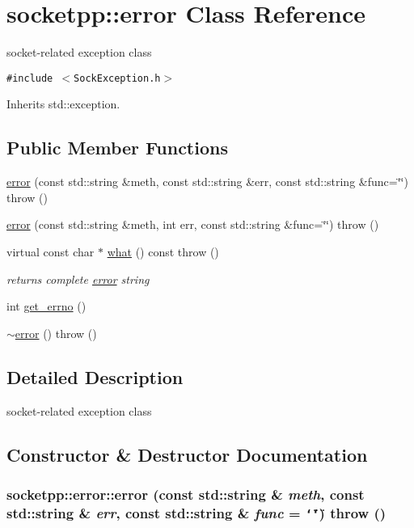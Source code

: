 \hypertarget{classsocketpp_1_1error}{
\section{socketpp::error Class Reference}
\label{classsocketpp_1_1error}
}
socket-related exception class  


{\tt \#include $<$SockException.h$>$}

Inherits std::exception.

\subsection*{Public Member Functions}
\begin{CompactItemize}
\item 
\hyperlink{classsocketpp_1_1error_614fef9f326d7bb212771eb20a046290}{error} (const std::string \&meth, const std::string \&err, const std::string \&func=\char`\"{}\char`\"{})  throw ()
\item 
\hyperlink{classsocketpp_1_1error_1287e8ec1ff5f7b18d91ea65c2505ae8}{error} (const std::string \&meth, int err, const std::string \&func=\char`\"{}\char`\"{})  throw ()
\item 
virtual const char $\ast$ \hyperlink{classsocketpp_1_1error_4b03541ebad2b9d0b73222cd505ea50f}{what} () const   throw ()
\begin{CompactList}\small\item\em returns complete \hyperlink{classsocketpp_1_1error}{error} string \item\end{CompactList}\item 
int \hyperlink{classsocketpp_1_1error_e1d23816909f2663b5553d232110442b}{get\_\-errno} ()
\item 
\hyperlink{classsocketpp_1_1error_f41562a951322078eff6f56268f2f257}{$\sim$error} ()  throw ()
\end{CompactItemize}


\subsection{Detailed Description}
socket-related exception class 

\subsection{Constructor \& Destructor Documentation}
\hypertarget{classsocketpp_1_1error_614fef9f326d7bb212771eb20a046290}{
\subsubsection[{error}]{\setlength{\rightskip}{0pt plus 5cm}socketpp::error::error (const std::string \& {\em meth}, \/  const std::string \& {\em err}, \/  const std::string \& {\em func} = {\tt \char`\"{}\char`\"{}})  throw ()}}
\label{classsocketpp_1_1error_614fef9f326d7bb212771eb20a046290}


